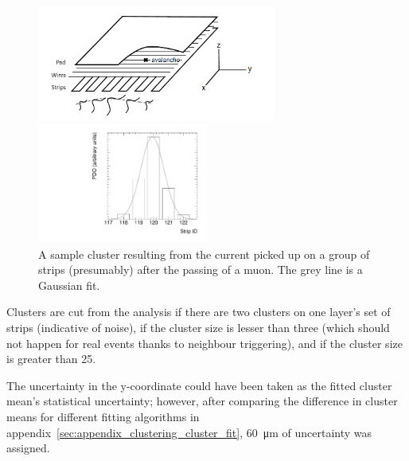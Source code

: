 \begin{figure}
    \centering
    \includegraphics[width = 0.7\textwidth]{figures/mwpc_lefebvre_thesis_gatti.png}
    \caption{A sketch of an sTGC-like detector. The position of the avalanche could be extracted from the wires and strips that picked up the avalanche signal. The signals on individual strips are sketched. Clustering was the processs of fitting a Gaussian to the peak value of the signals on individual contiguous strips, as is done in figure~\ref{fig:sample_cluster}. In this work, the x(y)-coordinate will always refer to the coordinate perpendicular to the wires (strips)~\cite{lefebvre_thesis, gatti_optimum_1979}.}
    \label{fig:mwpc_coords}
    \vspace*{\floatsep}
    \centering
    \includegraphics[width = 0.5\textwidth]{figures/sample_cluster_QL2C04_event5_layer2.pdf}
    \caption{A sample cluster resulting from the current picked up on a group of strips (presumably) after the passing of a muon. The grey line is a Gaussian fit.}
    \label{fig:sample_cluster}
\end{figure}

Clusters are cut from the analysis if there are two clusters on one layer's set of strips (indicative of noise), if the cluster size is lesser than three (which should not happen for real events thanks to neighbour triggering), and if the cluster size is greater than 25.

The uncertainty in the y-coordinate could have been taken as the fitted cluster mean's statistical uncertainty; however, after comparing the difference in cluster means for different fitting algorithms in appendix~\ref{sec:appendix_clustering_cluster_fit}, \SI{60}{\micro\meter} of uncertainty was assigned.

